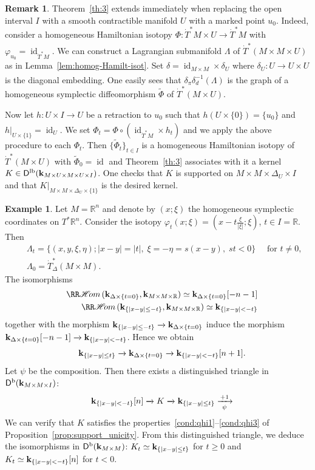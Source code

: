\documentclass[12pt,leqno]{article}
\theoremstyle{definition}
\newtheorem{example}[theorem]{Example}
\newtheorem{remark}[theorem]{Remark}
\newcommand{\R}{{\mathbb{R}}}
\def\phi{{\varphi}}
\newcommand{\cor}{{\bf k}}
\renewcommand{\to}[1][]{\xrightarrow[]{#1}}
\newcommand{\rhom}[1][]{{\RR\mathscr{H}\mspace{-3mu}om}_{\raise1.5ex\hbox to.1em{}#1}}
\newcommand{\opb}[1]{#1^{-1}}
\newcommand{\cl}{\colon}
\newcommand{\tw}[1]{\widetilde{#1}}
\newcommand{\eqn}{\begin{eqnarray*}}
\newcommand{\eneqn}{\end{eqnarray*}}
\DeclareMathOperator{\id}{id}
\newcommand{\Der}[1][]{\mathsf{D}^{#1}}
\newcommand{\Derb}{\Der[\mathrm{b}]}
\newcommand{\Derlb}{\Der[\mathrm{lb}]}
\newcommand{\dT}{{\dot{T}}}
\numberwithin{equation}{section}
\begin{document}
\begin{remark}\label{rem:contractible}
Theorem~\ref{th:3} extends immediately when replacing the open
interval $I$ with a smooth contractible manifold $U$ with a marked
point $u_0$.
Indeed, consider a homogeneous Hamiltonian isotopy
$\Phi\cl \dT^*M \times U \to \dT^*M$ with $\phi_{u_0}=\id_{\dT^*M}$. 
We can construct a Lagrangian submanifold 
$\Lambda$ of $\dT^*(M\times M\times U)$ as in Lemma~\ref{lem:homog-Hamilt-isot}.
Set $\delta=\id_{M\times M}\times\delta_U$ where 
$\delta_U\cl U\to U\times U$ is the diagonal embedding.
One easily sees that
$\delta_\pi \opb{\delta_d} (\Lambda)$ is the graph of a homogeneous symplectic
diffeomorphism $\tw \Phi$ of $\dT^*(M\times U)$.

Now let $h\cl U\times I \to U$ be a retraction
to $u_0$ such that $h(U\times \{0\}) = \{u_0\}$ and $h|_{U\times \{1\}} =\id_U$.
We set $\Phi_t = \Phi \circ (\id_{\dT^*M} \times h_t)$ and we apply the above
procedure to each $\Phi_t$.
Then $\{\tw\Phi_t\}_{t\in I}$ is a homogeneous Hamiltonian isotopy of
$\dT^*(M\times U)$ with $\tw\Phi_0 = \id$ and
Theorem~\ref{th:3} associates with it a kernel
$K\in \Derlb(\cor_{M\times U \times M\times U \times I})$.
One checks that $K$ is supported on $M\times M\times \Delta_U \times I$
and that $K|_{M\times M\times \Delta_U \times \{1\}}$ is the desired kernel.
\end{remark}

\begin{example}
Let $M=\R^n$ and denote by $(x;\xi)$ the homogeneous symplectic
coordinates on $T^*\R^n$. Consider the isotopy 
$\phi_t(x;\xi)= (x-t\frac{\xi}{\vert\xi\vert};\xi)$, $t\in I=\R$.
Then 
\eqn
&&\Lambda_t=\{(x,y,\xi,\eta);
\vert x-y\vert=\vert t\vert,\;\xi=-\eta=s(x-y),\; st<0\}
\quad\mbox{ for }t\neq0,\\
&&\Lambda_0=\dot T^*_\Delta (M\times M).
\eneqn
The isomorphisms 
\eqn
&&\rhom(\cor_{\Delta\times\{t=0\}},\cor_{M\times M\times\R})
\simeq\cor_{\Delta\times\{t=0\}}[-n-1]\\
&&\rhom(\cor_{\{\vert x-y\vert\leq-t\}},\cor_{M\times M\times\R})
\simeq \cor_{\{\vert x-y\vert<-t\}}
\eneqn
together with the morphism
$\cor_{\{\vert x-y\vert\leq-t\}}\to\cor_{\Delta\times\{t=0\}}$
induce the morphism
$\cor_{\Delta\times\{t=0\}}[-n-1]\to \cor_{\{\vert x-y\vert<-t\}}$.
Hence we obtain
\eqn
&&\cor_{\{\vert x-y\vert\leq t\}}
\to \cor_{\Delta\times\{t=0\}}
\to\cor_{\{\vert x-y\vert<-t\}}[n+1].
\eneqn
Let $\psi$ be the composition.
Then there exists a distinguished triangle in $\Derb(\cor_{M\times M\times I})$:
\eqn
&&\cor_{\{\vert x-y\vert<-t\}}[n]\to K\to 
\cor_{\{\vert x-y\vert\leq t\}}\xrightarrow[{\ \psi\ }]{+1}
\eneqn
We can verify that $K$ satisfies the
properties~\eqref{cond:qhi1}--\eqref{cond:qhi3} of
Proposition~\ref{prop:support_unicity}.
{}From this distinguished triangle, we deduce the isomorphisms 
in $\Derb(\cor_{M\times M})$:
$K_t\simeq \cor_{\{\vert x-y\vert\leq t\}}$ for $t\geq0$
and  $K_t\simeq\cor_{\{\vert x-y\vert<-t\}}[n]$ for $t<0$.
\end{example}
\end{document}
